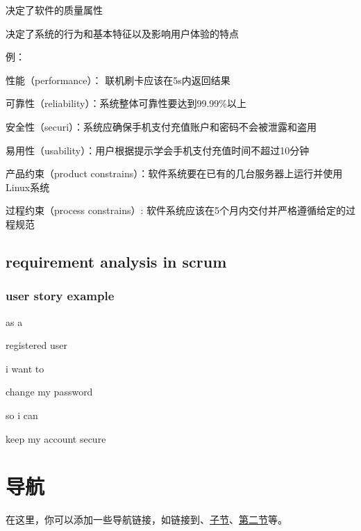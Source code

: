 \documentclass{ctexart}
\begin{document}
决定了软件的质量属性

决定了系统的行为和基本特征以及影响用户体验的特点

例：

性能（performance）： 联机刷卡应该在5s内返回结果

可靠性（reliability）：系统整体可靠性要达到99.99\%以上

安全性（securi）：系统应确保手机支付充值账户和密码不会被泄露和盗用

易用性（usability）：用户根据提示学会手机支付充值时间不超过10分钟

产品约束（product constrains）：软件系统要在已有的几台服务器上运行并使用Linux系统

过程约束（process constrains）: 软件系统应该在5个月内交付并严格遵循给定的过程规范

\subsection{requirement analysis in scrum}
\subsubsection{user story example}
as a

registered user

i want to 

change my password

so i can 

keep my account secure

\clearpage

\section*{导航}
\label{sec:navigation}

在这里，你可以添加一些导航链接，如链接到、\hyperref[subsec:sub]{子节}、\hyperref[sec:second]{第二节}等。
\end{document}

